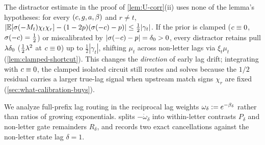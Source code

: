 \begin{remark}
\label{rem:shortcut-paradox}
The distractor estimate in the proof of \cref{lem:U-corr}(ii) uses none of the lemma's hypotheses: for every $(c, g, a, \beta)$ and $r \ne t$, $|\mathbb E[\sigma(-M_t)\chi_t\chi_r] - (1-2p)(\sigma(-c) - p)| \le \frac{1}{2}|\gamma_t|$. If the prior is clamped ($c \equiv 0$, $\sigma(-c) = \frac{1}{2}$) or miscalibrated by $|\sigma(-c) - p| = \delta_0 > 0$, every distractor retains pull $\lambda\delta_0$ ($\frac{1}{2}\lambda^2$ at $c \equiv 0$) up to $\frac{1}{2}|\gamma_t|$, shifting $\mu_t$ across non-letter lags via $\xi_t\mu_t$ (\cref{lem:clamped-shortcut}). This changes the \emph{direction} of early lag drift; integrating \stepode{} with $c \equiv 0$, the clamped isolated circuit still routes and solves because the $1/2$ residual carries a larger true-lag signal when upstream match signs $\chi_r$ are fixed (\cref{sec:what-calibration-buys}).
\end{remark}

We analyze full-prefix lag routing in the reciprocal lag weights $\omega_\delta := e^{-\beta_\delta}$ rather than ratios of growing exponentials.  splits $-\dot\omega_\delta$ into within-letter contrasts $P_\delta$ and non-letter gate remainders $R_\delta$, and records two exact cancellations against the non-letter state lag $\delta = 1$.

